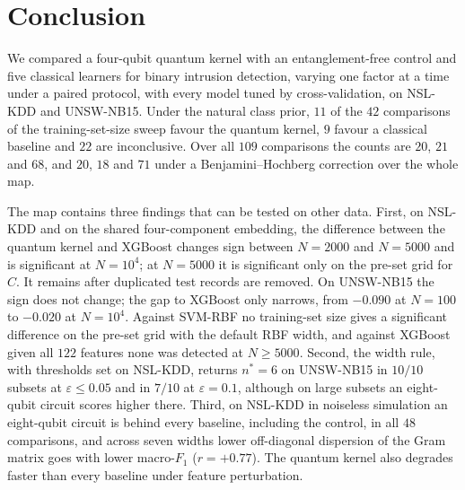 \section{Conclusion}\label{sec:conclusion}

We compared a four-qubit \ZZ{} quantum kernel with an entanglement-free control and five
classical learners for binary intrusion detection, varying one factor at a time under a paired
protocol, with every model tuned by cross-validation, on NSL-KDD and UNSW-NB15. Under the natural class prior, $11$ of
the $42$ comparisons of the training-set-size sweep favour the quantum kernel, $9$ favour a
classical baseline and $22$ are inconclusive. Over all $109$ comparisons the counts are $20$,
$21$ and $68$, and $20$, $18$ and $71$ under a Benjamini--Hochberg correction over the whole
map.

The map contains three findings that can be tested on other data. First, on NSL-KDD and on the
shared four-component embedding, the difference between the quantum kernel and XGBoost changes
sign between $N=2000$ and $N=5000$ and is significant at $N=10^4$; at $N=5000$ it is significant
only on the pre-set grid for $C$. It remains after duplicated test records are removed. On
UNSW-NB15 the sign does not change; the gap to XGBoost only narrows, from $-0.090$ at $N=100$ to $-0.020$
at $N=10^4$. Against SVM-RBF no training-set size gives a significant difference on the pre-set
grid with the default RBF width, and against XGBoost given all $122$ features
none was detected at $N\ge5000$. Second, the width rule,
with thresholds set on NSL-KDD, returns $n^{\ast}=6$ on UNSW-NB15 in $10/10$ subsets at
$\varepsilon\le0.05$ and in $7/10$ at $\varepsilon=0.1$, although on large subsets an
eight-qubit circuit scores higher there. Third, on NSL-KDD in noiseless simulation an
eight-qubit circuit is behind every baseline, including the \Zmap{} control, in all $48$ comparisons, and across seven widths lower off-diagonal
dispersion of the \ZZ{} Gram matrix goes with lower macro-$F_1$ ($r=+0.77$). The quantum kernel
also degrades faster than every baseline under feature perturbation.

